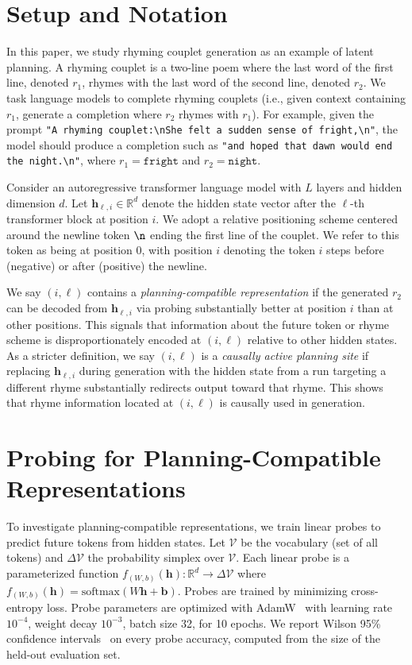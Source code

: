 \documentclass{article}
\begin{document}
\section{Setup and Notation}
\label{sec:2}
In this paper, we study rhyming couplet generation as an example of latent planning.
A rhyming couplet is a two-line poem where the last word of the first line, denoted $r_1$, rhymes with the last word of the second line, denoted $r_2$.
We task language models to complete rhyming couplets (i.e., given context containing $r_1$, generate a completion where $r_2$ rhymes with $r_1$). For example, given the prompt \texttt{"A rhyming couplet:\textbackslash nShe felt a sudden sense of fright,\textbackslash n"}, the model should produce a completion such as \texttt{"and hoped that dawn would end the night.\textbackslash n"}, where $r_1 = \texttt{fright}$ and $r_2 = \texttt{night}$.

Consider an autoregressive transformer language model with $L$ layers and hidden dimension $d$.
Let $\mathbf{h}_{\ell,i} \in \mathbb{R}^d$ denote the hidden state vector after the $\ell$-th transformer block at position $i$.
We adopt a relative positioning scheme centered around the newline token $\verb|\n|$ ending the first line of the couplet.
We refer to this token as being at position 0, with position $i$ denoting the token $i$ steps before (negative) or after (positive) the newline.

We say $(i, \ell)$ contains a \textit{planning-compatible representation} if the generated $r_2$ can be decoded from $\mathbf{h}_{\ell,i}$ via probing substantially better at position $i$ than at other positions.
This signals that information about the future token or rhyme scheme is disproportionately encoded at $(i, \ell)$ relative to other hidden states.
As a stricter definition, we say $(i, \ell)$ is a \textit{causally active planning site} if replacing $\mathbf{h}_{\ell,i}$ during generation with the hidden state from a run targeting a different rhyme substantially redirects output toward that rhyme.
This shows that rhyme information located at $(i, \ell)$ is causally used in generation.


\section{Probing for Planning-Compatible Representations}
\label{sec:probing}
To investigate planning-compatible representations, we train linear probes to predict future tokens from hidden states.
Let $\mathcal V$ be the vocabulary (set of all tokens) and $\Delta \mathcal V$ the probability simplex over $\mathcal V$.
Each linear probe is a parameterized function $f_{(W,b)}(\mathbf{h}): \mathbb{R}^d \to \Delta \mathcal V$ where $f_{(W,b)}(\mathbf{h}) = \text{softmax}(W\mathbf{h} + \mathbf{b})$.
Probes are trained by minimizing cross-entropy loss. Probe parameters are optimized with AdamW~\citep{adamw} with learning rate $10^{-4}$, weight decay $10^{-3}$, batch size 32, for 10 epochs. We report Wilson 95\% confidence intervals~\citep{wilson1927} on every probe accuracy, computed from the size of the held-out evaluation set.
\end{document}
